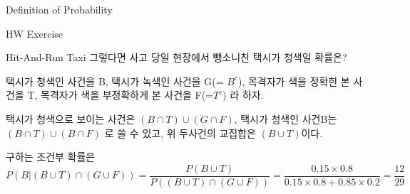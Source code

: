 \begin{edXchapter}{Definition of Probability}
\begin{edXsection}{HW Exercise}
\begin{edXvertical}
\begin{edXproblem}{Hit-And-Run Taxi}
그렇다면 사고 당일 현장에서 뺑소니친 택시가 청색일 확률은?
\begin{edXsolution}
택시가 청색인 사건을 B, 택시가 녹색인 사건을 G(= $B^c$), \newline
목격자가 색을 정확힌 본 사건을 T, 목격자가 색을 부정확하게 본 사건을 F(=$T^c$)
라 하자.

택시가 청색으로 보이는 사건은 $(B \cap T) \cup (G \cap F)$,
택시가 청색인 사건B는  $(B \cap T) \cup (B \cap F)$ 로 쓸 수 있고,
위 두사건의 교집합은 $(B \cup T)$이다.

구하는 조건부 확률은 
\begin{equation}
P(B |(B \cup T) \cap (G \cup F)) = \frac{P(B \cup T)}{P((B \cup T) \cap (G \cup F))} = \frac{0.15 \times 0.8}{0.15 \times 0.8 + 0.85 \times 0.2} = \frac{12}{29}
\end{equation}
\end{edXsolution}
\end{edXproblem}

\end{edXvertical}
\end{edXsection}
\end{edXchapter}
